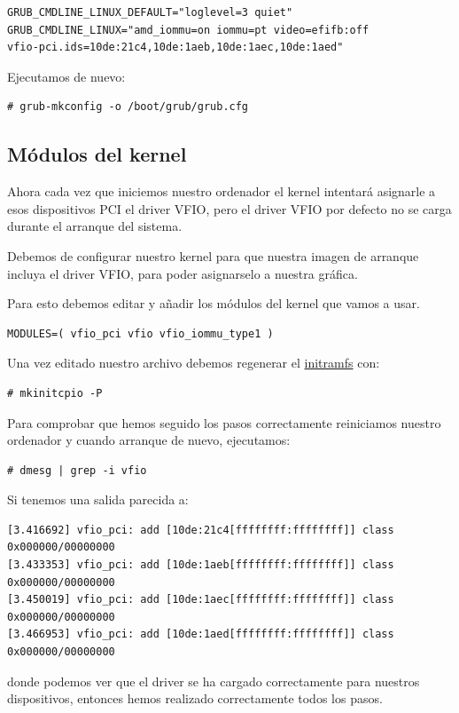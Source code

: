 \documentclass[12pt]{article}
\begin{document}
\begin{verbatim}
GRUB_CMDLINE_LINUX_DEFAULT="loglevel=3 quiet"
GRUB_CMDLINE_LINUX="amd_iommu=on iommu=pt video=efifb:off
vfio-pci.ids=10de:21c4,10de:1aeb,10de:1aec,10de:1aed"
\end{verbatim}

Ejecutamos de nuevo:
\begin{verbatim}
# grub-mkconfig -o /boot/grub/grub.cfg
\end{verbatim}

\subsection{Módulos del kernel}

Ahora cada vez que iniciemos nuestro ordenador el kernel intentará asignarle a esos dispositivos PCI el driver VFIO, pero el driver VFIO por defecto no se carga durante el arranque del sistema.

\medskip
Debemos de configurar nuestro kernel para que nuestra imagen de arranque incluya el driver VFIO, para poder asignarselo a nuestra gráfica.

\medskip
Para esto debemos editar  y añadir los módulos del kernel que vamos a usar.

\begin{verbatim}
MODULES=( vfio_pci vfio vfio_iommu_type1 )
\end{verbatim}

Una vez editado nuestro archivo debemos regenerar el \href{https://en.wikipedia.org/wiki/Initial\_ramdisk}{initramfs} con:
\begin{verbatim}
# mkinitcpio -P
\end{verbatim}

Para comprobar que hemos seguido los pasos correctamente reiniciamos nuestro ordenador y cuando arranque de nuevo, ejecutamos:
\begin{verbatim}
# dmesg | grep -i vfio
\end{verbatim}

Si tenemos una salida parecida a:
\begin{lstlisting}[basicstyle=\small\ttfamily]
[3.416692] vfio_pci: add [10de:21c4[ffffffff:ffffffff]] class 0x000000/00000000
[3.433353] vfio_pci: add [10de:1aeb[ffffffff:ffffffff]] class 0x000000/00000000
[3.450019] vfio_pci: add [10de:1aec[ffffffff:ffffffff]] class 0x000000/00000000
[3.466953] vfio_pci: add [10de:1aed[ffffffff:ffffffff]] class 0x000000/00000000
\end{lstlisting}
donde podemos ver que el driver  se ha cargado correctamente para nuestros dispositivos, entonces hemos realizado correctamente todos los pasos.
\end{document}
